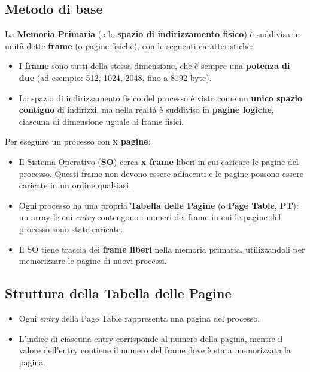 \subsection{Metodo di base}
La \textbf{Memoria Primaria} (o lo \textbf{spazio di indirizzamento fisico}) è suddivisa in unità dette \textbf{frame} (o pagine fisiche), con le seguenti caratteristiche:
\begin{itemize}
    \item I \textbf{frame} sono tutti della stessa dimensione, che è sempre una \textbf{potenza di due} (ad esempio: 512, 1024, 2048, fino a 8192 byte).
    \item Lo spazio di indirizzamento fisico del processo è visto come un \textbf{unico spazio contiguo} di indirizzi, ma nella realtà è suddiviso in \textbf{pagine logiche}, ciascuna di dimensione uguale ai frame fisici.
\end{itemize}

Per eseguire un processo con \textbf{x pagine}:
\begin{itemize}
    \item Il Sistema Operativo (\textbf{SO}) cerca \textbf{x frame} liberi in cui caricare le pagine del processo. Questi frame non devono essere adiacenti e le pagine possono essere caricate in un ordine qualsiasi.
    \item Ogni processo ha una propria \textbf{Tabella delle Pagine} (o \textbf{Page Table}, \textbf{PT}): un array le cui \emph{entry} contengono i numeri dei frame in cui le pagine del processo sono state caricate.
    \item Il SO tiene traccia dei \textbf{frame liberi} nella memoria primaria, utilizzandoli per memorizzare le pagine di nuovi processi.
\end{itemize}

\subsection*{Struttura della Tabella delle Pagine}
\begin{itemize}
    \item Ogni \emph{entry} della Page Table rappresenta una pagina del processo.
    \item L'indice di ciascuna entry corrisponde al numero della pagina, mentre il valore dell'entry contiene il numero del frame dove è stata memorizzata la pagina.
\end{itemize}

